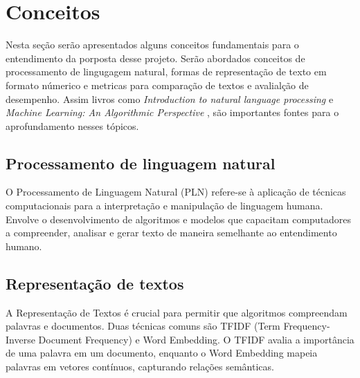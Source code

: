 \chapter{Conceitos}

Nesta seção serão apresentados alguns conceitos fundamentais para o entendimento da porposta desse projeto. Serão abordados conceitos de processamento de lingugagem natural, formas de representação de texto em formato númerico e metricas para comparação de textos e avalialção de desempenho. Assim livros como \textit{Introduction to natural language processing} \cite{NLP} e \textit{Machine Learning: An Algorithmic Perspective} \cite{ML}, são importantes fontes para o aprofundamento nesses tópicos.

\section{Processamento de linguagem natural}

O Processamento de Linguagem Natural (PLN) refere-se à aplicação de técnicas computacionais para a interpretação e manipulação de linguagem humana. Envolve o desenvolvimento de algoritmos e modelos que capacitam computadores a compreender, analisar e gerar texto de maneira semelhante ao entendimento humano.

\section{Representação de textos}

A Representação de Textos é crucial para permitir que algoritmos compreendam palavras e documentos. Duas técnicas comuns são TFIDF (Term Frequency-Inverse Document Frequency) e Word Embedding. O TFIDF avalia a importância de uma palavra em um documento, enquanto o Word Embedding mapeia palavras em vetores contínuos, capturando relações semânticas.



